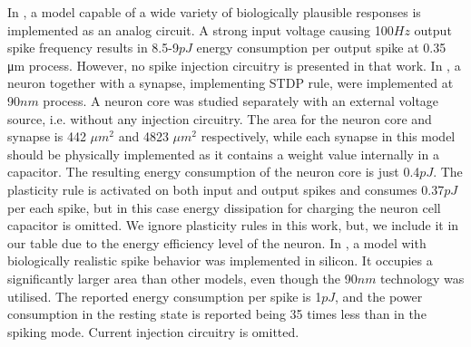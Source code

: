 \documentclass[conference, compsoc]{IEEEtran}
\begin{document}
In \cite{Wijekoon_compact_silicon_circuit}, a model capable of a wide variety of biologically plausible responses is implemented as an analog circuit. A strong input voltage causing 100$ Hz $ output spike frequency results in 8.5-9$ pJ $ energy consumption per output spike at 0.35 μm process. However, no spike injection circuitry is presented in that work. In \cite{Energy-Efficient-Neuron}, a neuron together with a synapse, implementing STDP rule, were implemented at 90$ nm $ process. A neuron core was studied separately with an external voltage source, i.e. without any injection circuitry. The area for the neuron core and synapse is 442 $ \mu m^{2} $ and 4823 $ \mu m^{2} $ respectively, while each synapse in this model should be physically implemented as it contains a weight value internally in a capacitor. The resulting energy consumption of the neuron core  is just 0.4$ pJ $. The plasticity rule is activated on both input and output spikes and consumes 0.37$ pJ $ per each spike, but in this case energy dissipation for charging the neuron cell capacitor is omitted. We ignore plasticity rules in this work, but, we include it in our table due to the energy efficiency level of the neuron. In \cite{Subthreshold_Izhikevich}, a model with biologically realistic spike behavior was implemented in silicon. It occupies a significantly larger area than other models, even though the 90$ nm $ technology was utilised. The reported energy consumption per spike is 1$ pJ $, and the power consumption in the resting state is reported being 35 times less than in the spiking mode. Current injection circuitry is omitted.
\end{document}
